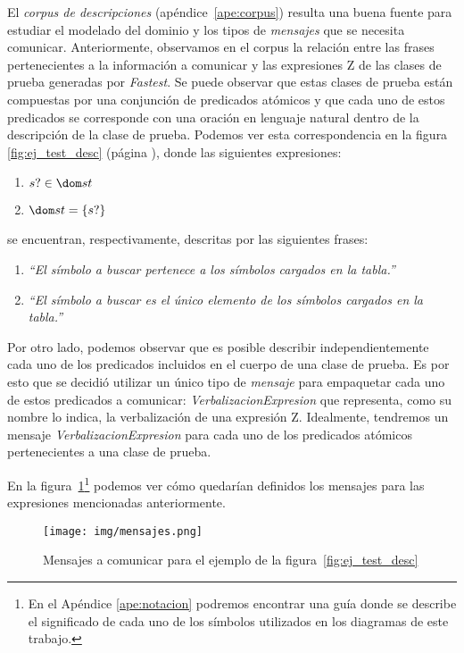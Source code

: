 El \emph{corpus de descripciones} (apéndice~\ref{ape:corpus}) resulta una buena fuente para estudiar el modelado del dominio y los tipos de \emph{mensajes} que se necesita comunicar. Anteriormente, observamos en el corpus la relación entre las frases pertenecientes a la información a comunicar y las expresiones Z de las clases de prueba generadas por \textit{Fastest}. Se puede observar que estas clases de prueba están compuestas por una conjunción de predicados atómicos y que cada uno de estos predicados se corresponde con una oración en lenguaje natural dentro de la descripción de la clase de prueba. Podemos ver esta correspondencia en la figura \ref{fig:ej_test_desc} (página \pageref{fig:ej_test_desc}), donde las siguientes expresiones:

\medskip
\begin{enumerate}
  \item{$s? \in \dom st$}
  \item{$\dom st = \{ s? \}$}
\end{enumerate}

\medskip
\noindent
se encuentran, respectivamente, descritas por las siguientes frases:

\medskip
\begin{enumerate}
 \item{\emph{``El símbolo a buscar pertenece a los símbolos cargados en la tabla.''}}
 \item{\emph{``El símbolo a buscar es el único elemento de los símbolos cargados en la tabla.''}}
\end{enumerate}

\bigskip
Por otro lado, podemos observar que es posible describir independientemente cada uno de los predicados incluidos en el cuerpo de una clase de prueba. Es por esto que se decidió utilizar un único tipo de \emph{mensaje} para empaquetar cada uno de estos predicados a comunicar: \emph{VerbalizacionExpresion} que representa, como su nombre lo indica, la verbalización de una expresión Z. Idealmente, tendremos un mensaje \emph{VerbalizacionExpresion} para cada uno de los predicados atómicos pertenecientes a una clase de prueba.

En la figura~\ref{fig:ej_mensajes}\footnote{En el Apéndice \ref{ape:notacion} podremos encontrar una guía donde se describe el significado de cada uno de los símbolos utilizados en los diagramas de este trabajo.} podemos ver cómo quedarían definidos los mensajes para las expresiones mencionadas anteriormente.

\begin{figure}[H]
  	\centering
	\texttt{[image: img/mensajes.png]}
	\caption{Mensajes a comunicar para el ejemplo de la figura~\ref{fig:ej_test_desc}}
  	\label{fig:ej_mensajes}
\end{figure}

